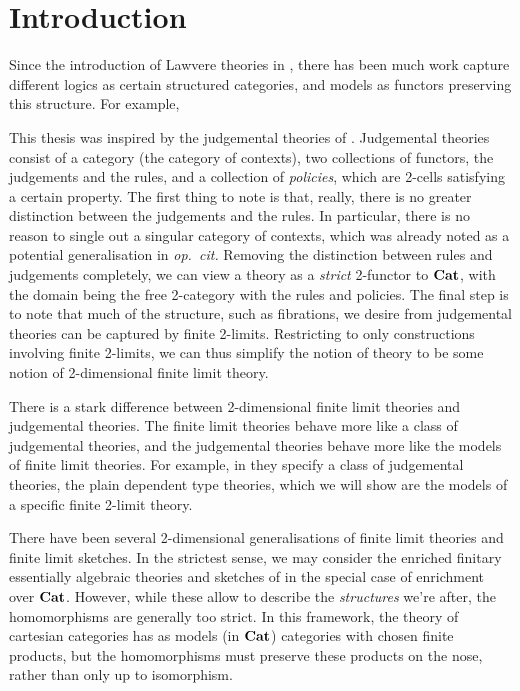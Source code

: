 \documentclass[../thesis.tex]{subfiles}
\begin{document}
  \chapter{Introduction}
  
  

  Since the introduction of Lawvere theories in \cite{lawvere1963}, there has been much work 
  capture different logics as certain structured categories, and models as functors preserving this structure.
  For example, 

  This thesis was inspired by the judgemental theories of \cite{coraglia2024a}. Judgemental theories consist of
  a category (the category of contexts), two collections of functors, the judgements and the rules, and a
  collection of \emph{policies}, which are 2-cells satisfying a certain property. The first thing to note
  is that, really, there is no greater distinction between the judgements and the rules. In particular, there
  is no reason to single out a singular category of contexts, which was already noted as a potential
  generalisation in \emph{op.\ cit.} Removing the distinction between rules and judgements completely, we
  can view a theory as a \emph{strict} 2-functor to ${\mathbf{Cat}}$, with the domain being the free 2-category with
  the rules and policies. The final step is to note that much of the structure, such as fibrations, we desire
  from judgemental theories can be captured by finite 2-limits. Restricting to only constructions involving
  finite 2-limits, we can thus simplify the notion of theory to be some notion of 2-dimensional finite limit
  theory.

  \begin{remark}
    There is a stark difference between 2-dimensional finite limit theories and judgemental theories. The finite
    limit theories behave more like a class of judgemental theories, and the judgemental theories behave more
    like the models of finite limit theories. For example, in \cite{coraglia2024a} they specify a class of
    judgemental theories, the plain dependent type theories, which we will show are the models of a specific
    finite 2-limit theory. 
  \end{remark}

  There have been several 2-dimensional generalisations of finite limit theories and finite limit sketches. In
  the strictest sense, we may consider the enriched finitary essentially algebraic theories and sketches of
  \cite{kelly1982b} in the special case of enrichment over ${\mathbf{Cat}}$. However, while these allow to describe the
  \emph{structures} we're after, the homomorphisms are generally too strict. In this framework, the theory of
  cartesian categories has as models (in ${\mathbf{Cat}}$) categories with chosen finite products, but the homomorphisms
  must preserve these products on the nose, rather than only up to isomorphism. 
  
\end{document}
